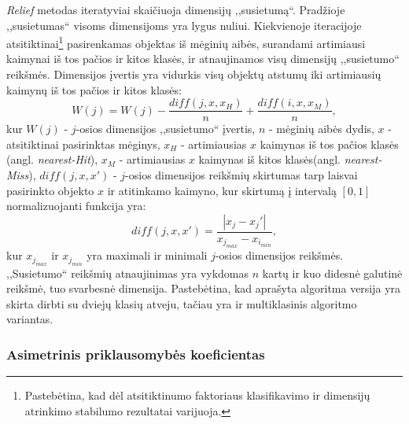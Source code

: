 \textit{Relief} metodas iteratyviai skaičiuoja dimensijų ,,susietumą``. Pradžioje
,,susietumas`` visoms dimensijoms yra lygus nuliui. Kiekvienoje
iteracijoje atsitiktinai\footnote{Pastebėtina, kad dėl atsitiktinumo faktoriaus klasifikavimo ir  dimensijų atrinkimo stabilumo
rezultatai varijuoja.} pasirenkamas objektas iš mėginių aibės, surandami
artimiausi kaimynai iš tos pačios ir kitos klasės, ir atnaujinamos visų 
dimensijų ,,susietumo`` reikšmės. Dimensijos įvertis yra vidurkis visų objektų
atstumų iki artimiausių kaimynų iš tos pačios ir kitos klasės:
\begin{equation}
 W(j)=W(j) - \frac{diff(j, x, x_H)}{n} + \frac{diff(i, x, x_M)}{n},
\end{equation}
kur 
$W(j)$ - $j$-osios dimensijos ,,susietumo`` įvertis, 
$n$ - mėginių aibės dydis, 
$x$ - atsitiktinai pasirinktas mėginys, 
$x_H$ - artimiausias $x$ kaimynas iš tos pačios klasės (angl. \textit{nearest-Hit}), 
$x_M$ - artimiausias $x$ kaimynas iš kitos klasės(angl. \textit{nearest-Miss}),
$diff(j, x, x')$ - $j$-osios dimensijos reikšmių skirtumas tarp laisvai pasirinkto objekto $x$ ir atitinkamo kaimyno, kur skirtumą į intervalą $[0, 1]$ normalizuojanti funkcija yra:
\begin{equation}
 diff(j, x, x')=\frac{|x_j- x_j'|}{x_{j_{max}} - x_{i_{min}}},
\end{equation}
kur $x_{j_{max}}$ ir $x_{j_{min}}$ yra maximali ir minimali $j$-osios dimensijos reikšmės. ,,Susietumo`` reikšmių atnaujinimas yra vykdomas $n$ kartų ir kuo didesnė galutinė reikšmė, tuo svarbesnė dimensija. Pastebėtina, kad aprašyta algoritma versija yra skirta dirbti su dviejų klasių atveju, tačiau yra ir multiklasinis algoritmo variantas.

\subsubsection{Asimetrinis priklausomybės koeficientas}

